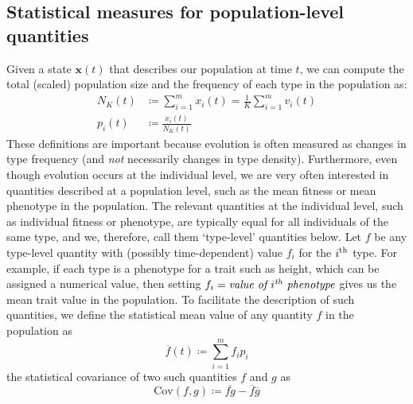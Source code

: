 \subsection{Statistical measures for population-level quantities}
Given a state $\mathbf{x}(t)$ that describes our population at time $t$, we can compute the total (scaled) population size and the frequency of each type in the population as:
\begin{equation}
\label{nD_tot_pop_and_prop_inds_defn}
\begin{aligned}
N_{K}(t) &\coloneqq \sum\limits_{i=1}^{m}x_i(t) = \frac{1}{K}\sum\limits_{i=1}^{m}v_i(t)\\
p_i(t) &\coloneqq \frac{x_i(t)}{N_{K}(t)}
\end{aligned}
\end{equation}
These definitions are important because evolution is often measured as changes in type frequency (and \emph{not} necessarily changes in type density). Furthermore, even though evolution occurs at the individual level, we are very often interested in quantities described at a population level, such as the mean fitness or mean phenotype in the population. The relevant quantities at the individual level, such as individual fitness or phenotype, are typically equal for all individuals of the same type, and we, therefore, call them `type-level' quantities below. Let $f$ be any type-level quantity with (possibly time-dependent) value $f_i$ for the $i\textsuperscript{th}$ type. For example, if each type is a phenotype for a trait such as height, which can be assigned a numerical value, then setting $f_i = \textit{value of $i\textsuperscript{th}$ phenotype}$ gives us the mean trait value in the population. To facilitate the description of such quantities, we define the statistical mean value of any quantity $f$ in the population as
\begin{equation}
\label{nD_mean}
\overline{f}(t) \coloneqq \sum\limits_{i=1}^{m}f_ip_{i}
\end{equation}
the statistical covariance of two such quantities $f$ and $g$ as
\begin{equation}
\label{nD_cov}
\textrm{Cov}(f,g) \coloneqq \overline{fg} - \overline{f}\overline{g}
\end{equation}

